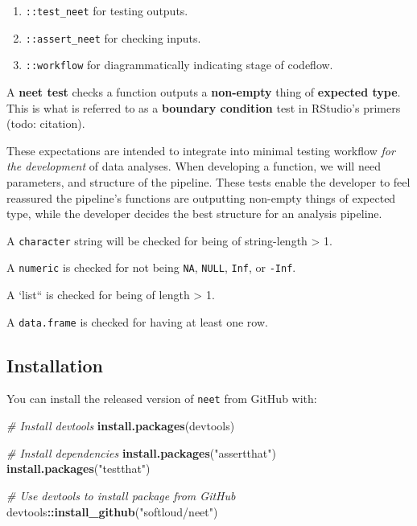 \documentclass[
]{article}
\newenvironment{Shaded}{\begin{snugshade}}{\end{snugshade}}
\newcommand{\CommentTok}[1]{\textcolor[rgb]{0.56,0.35,0.01}{\textit{#1}}}
\newcommand{\KeywordTok}[1]{\textcolor[rgb]{0.13,0.29,0.53}{\textbf{#1}}}
\newcommand{\NormalTok}[1]{#1}
\newcommand{\OperatorTok}[1]{\textcolor[rgb]{0.81,0.36,0.00}{\textbf{#1}}}
\newcommand{\StringTok}[1]{\textcolor[rgb]{0.31,0.60,0.02}{#1}}
\providecommand{\tightlist}{%
  \setlength{\itemsep}{0pt}\setlength{\parskip}{0pt}}
\begin{document}
\begin{enumerate}
\def\labelenumi{\arabic{enumi}.}
\tightlist
\item
  \texttt{::test\_neet} for testing outputs.
\item
  \texttt{::assert\_neet} for checking inputs.
\item
  \texttt{::workflow} for diagrammatically indicating stage of codeflow.
\end{enumerate}

A \textbf{neet test} checks a function outputs a \textbf{non-empty} thing of \textbf{expected type}. This is what is referred to as a \textbf{boundary condition} test in RStudio's primers (todo: citation).

These expectations are intended to integrate into minimal testing workflow
\emph{for the development} of data analyses. When developing a function, we will need parameters, and structure of the pipeline. These tests
enable the developer to feel reassured the pipeline's functions are
outputting non-empty things of expected type, while the developer decides the best structure for an analysis pipeline.

A \texttt{character} string will be checked for being of string-length \textgreater{} 1.

A \texttt{numeric} is checked for not being \texttt{NA}, \texttt{NULL}, \texttt{Inf}, or \texttt{-Inf}.

A `list`` is checked for being of length \textgreater{} 1.

A \texttt{data.frame} is checked for having at least one row.

\hypertarget{installation}{%
\subsection{Installation}\label{installation}}

You can install the released version of \texttt{neet} from GitHub with:

\begin{Shaded}
\begin{Highlighting}[]
\CommentTok{\# Install devtools}
\KeywordTok{install.packages}\NormalTok{(devtools) }

\CommentTok{\# Install dependencies}
\KeywordTok{install.packages}\NormalTok{(}\StringTok{"assertthat"}\NormalTok{)}
\KeywordTok{install.packages}\NormalTok{(}\StringTok{"testthat"}\NormalTok{)}

\CommentTok{\# Use devtools to install package from GitHub}
\NormalTok{devtools}\OperatorTok{::}\KeywordTok{install\_github}\NormalTok{(}\StringTok{"softloud/neet"}\NormalTok{)}
\end{Highlighting}
\end{Shaded}
\end{document}
